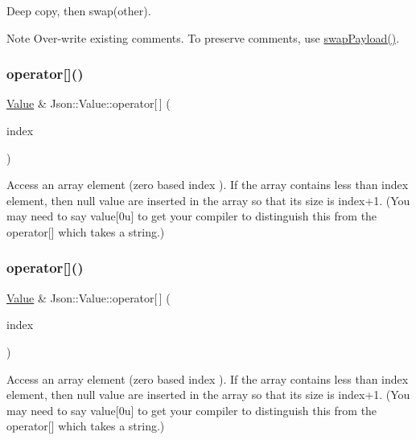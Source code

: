 Deep copy, then swap(other). \begin{DoxyNote}{Note}
Over-\/write existing comments. To preserve comments, use \hyperlink{classJson_1_1Value_a5263476047f20e2fc6de470e4de34fe5}{swap\+Payload()}. 
\end{DoxyNote}
\mbox{\label{classJson_1_1Value_a7d99f5dba388cdaa152ce6ef933d64ef}} 
\subsubsection{\texorpdfstring{operator[]()}{operator[]()}\hspace{0.1cm}{\footnotesize\ttfamily [1/9]}}
{\footnotesize\ttfamily \hyperlink{classJson_1_1Value}{Value} \& Json\+::\+Value\+::operator\mbox{[}$\,$\mbox{]} (\begin{DoxyParamCaption}\item[{Array\+Index}]{index }\end{DoxyParamCaption})}

Access an array element (zero based index ). If the array contains less than index element, then null value are inserted in the array so that its size is index+1. (You may need to say \textquotesingle{}value\mbox{[}0u\mbox{]}\textquotesingle{} to get your compiler to distinguish this from the operator\mbox{[}\mbox{]} which takes a string.) \mbox{\label{classJson_1_1Value_ac9182982c361e0ab621134d406e5f250}} 
\subsubsection{\texorpdfstring{operator[]()}{operator[]()}\hspace{0.1cm}{\footnotesize\ttfamily [2/9]}}
{\footnotesize\ttfamily \hyperlink{classJson_1_1Value}{Value} \& Json\+::\+Value\+::operator\mbox{[}$\,$\mbox{]} (\begin{DoxyParamCaption}\item[{int}]{index }\end{DoxyParamCaption})}

Access an array element (zero based index ). If the array contains less than index element, then null value are inserted in the array so that its size is index+1. (You may need to say \textquotesingle{}value\mbox{[}0u\mbox{]}\textquotesingle{} to get your compiler to distinguish this from the operator\mbox{[}\mbox{]} which takes a string.) \mbox{\label{classJson_1_1Value_a46607236038b29695ed80c15895271e4}} 

